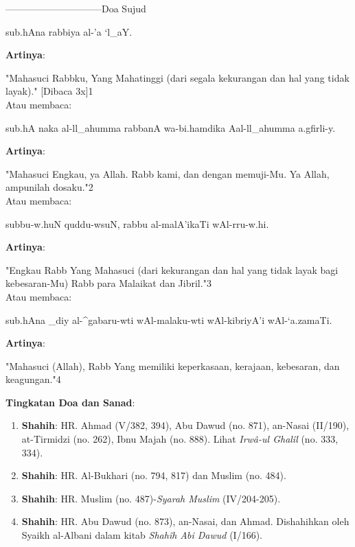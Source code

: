 \documentclass[a4paper,12pt]{article}
\begin{document}
\par
{}------------------------------Doa Sujud
\begin{arabtext}
\noindent
sub.hAna rabbiya al-'a `l_aY.\\
\end{arabtext}
\noindent
\textbf{Artinya}:
\par
\indent
"Mahasuci Rabbku, Yang Mahatinggi (dari segala kekurangan dan hal yang 
tidak layak)." [Dibaca 3x]{\scriptsize 1}\\
\indent Atau membaca:
\begin{arabtext}
\noindent
sub.hA naka al-ll_ahumma rabbanA wa-bi.hamdika Aal-ll_ahumma a.gfirli-y.\\
\end{arabtext}
\noindent
\textbf{Artinya}:
\par
\indent
"Mahasuci Engkau, ya Allah. Rabb kami, dan dengan memuji-Mu. Ya Allah, 
ampunilah dosaku."{\scriptsize 2}\\
\indent Atau membaca:
\begin{arabtext}
\noindent
subbu-w.huN quddu-wsuN, rabbu al-malA'ikaTi wAl-rru-w.hi.\\
\end{arabtext}
\noindent
\textbf{Artinya}:
\par
\indent
"Engkau Rabb Yang Mahasuci (dari kekurangan dan hal yang tidak layak bagi 
kebesaran-Mu) Rabb para Malaikat dan Jibril."{\scriptsize 3}\\
\indent Atau membaca:
\begin{arabtext}
\noindent
sub.hAna _diy al-^gabaru-wti wAl-malaku-wti wAl-kibriyA'i wAl-`a.zamaTi.\\
\end{arabtext}
\noindent
\textbf{Artinya}:
\par
\indent
"Mahasuci (Allah), Rabb Yang memiliki keperkasaan, kerajaan, kebesaran, 
dan keagungan."{\scriptsize 4}\\
\par
\noindent
\textbf{Tingkatan Doa dan Sanad}:
\begin{enumerate}
\item \textbf{Shahih}: HR. Ahmad (V/382, 394), Abu Dawud (no. 871), 
an-Nasai (II/190), at-Tirmidzi (no. 262), Ibnu Majah (no. 888). Lihat 
\textit{Irw\^{a}-ul Ghal\^{i}l} (no. 333, 334).
\item \textbf{Shahih}: HR. Al-Bukhari (no. 794, 817) dan Muslim (no. 484).
\item \textbf{Shahih}: HR. Muslim (no. 487)-\textit{Syarah Muslim} 
(IV/204-205).
\item \textbf{Shahih}: HR. Abu Dawud (no. 873), an-Nasai, dan Ahmad. 
Dishahihkan oleh Syaikh al-Albani dalam kitab \textit{Shah\^{i}h Abi 
Dawud} (I/166).\\\\
\end{enumerate}
\end{document}
